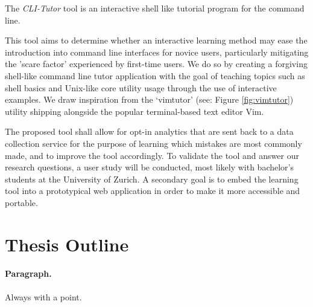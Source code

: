 The \textit{CLI-Tutor} tool is an interactive shell like tutorial program for
the command line.

This tool aims to determine whether an interactive learning method may ease the
introduction into command line interfaces for novice users, particularly
mitigating the 'scare factor' experienced by first-time users. We do so by
creating a forgiving shell-like command line tutor application with the goal of
teaching topics such as shell  basics and Unix-like core utility usage through
the use of interactive examples. We draw inspiration from the
`vimtutor'\cite{pierce_ware_smith_moolenaar_2019} (see: Figure \ref{fig:vimtutor})
utility shipping alongside the popular terminal-based text editor Vim.

The proposed tool shall allow for opt-in analytics that are sent back to a data
collection service for the purpose of learning which mistakes are most commonly
made, and to improve the tool accordingly. To validate the tool and answer our
research questions, a user study will be conducted, most likely with bachelor's
students at the University of Zurich. A secondary goal is to embed the learning
tool into a prototypical web application in order to make it more accessible
and portable.


\section{Thesis Outline}

\paragraph{Paragraph.} Always with a point. {}
